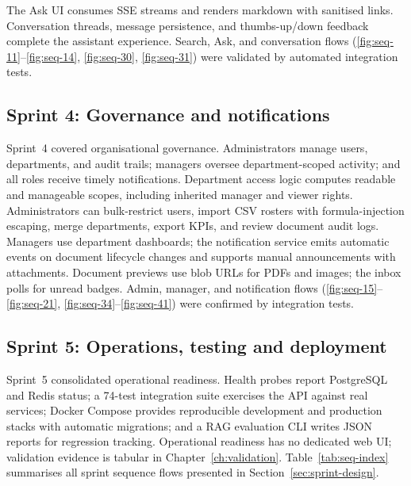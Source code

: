 The Ask UI consumes SSE streams and renders markdown with sanitised links.
Conversation threads, message persistence, and thumbs-up/down feedback complete
the assistant experience. Search, Ask, and conversation flows
(\ref{fig:seq-11}--\ref{fig:seq-14}, \ref{fig:seq-30}, \ref{fig:seq-31}) were
validated by automated integration tests.



\subsection{Sprint 4: Governance and notifications}
\label{subsec:impl-sprint4}

Sprint~4 covered organisational governance. Administrators manage users,
departments, and audit trails; managers oversee department-scoped activity; and
all roles receive timely notifications. Department access logic computes readable
and manageable scopes, including inherited manager and viewer rights.
Administrators can bulk-restrict users, import CSV rosters with formula-injection
escaping, merge departments, export KPIs, and review document audit logs.
Managers use department dashboards; the notification service emits automatic
events on document lifecycle changes and supports manual announcements with
attachments. Document previews use blob URLs for PDFs and images; the inbox
polls for unread badges. Admin, manager, and notification flows
(\ref{fig:seq-15}--\ref{fig:seq-21}, \ref{fig:seq-34}--\ref{fig:seq-41}) were
confirmed by integration tests.



\subsection{Sprint 5: Operations, testing and deployment}
\label{subsec:impl-sprint5}

Sprint~5 consolidated operational readiness. Health probes report PostgreSQL and
Redis status; a 74-test integration suite exercises the API against real services;
Docker Compose provides reproducible development and production stacks with
automatic migrations; and a RAG evaluation CLI writes JSON reports for regression
tracking. Operational readiness has no dedicated web UI; validation evidence is
tabular in Chapter~\ref{ch:validation}. Table~\ref{tab:seq-index} summarises all
sprint sequence flows presented in Section~\ref{sec:sprint-design}.

